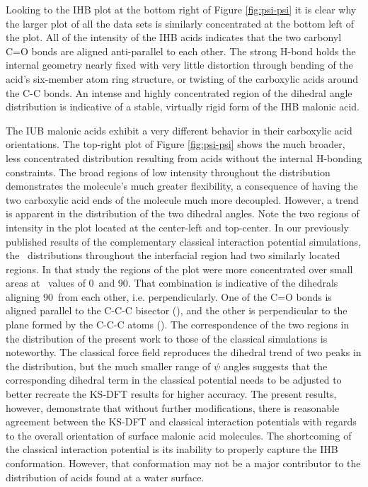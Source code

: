Looking to the IHB plot at the bottom right of Figure \ref{fig:psi-psi} it is clear why the larger plot of all the data sets is similarly concentrated at the bottom left of the plot. All of the intensity of the IHB acids indicates that the two carbonyl C=O bonds are aligned anti-parallel to each other. The strong H-bond holds the internal geometry nearly fixed with very little distortion through bending of the acid's six-member atom ring structure, or twisting of the carboxylic acids around the C-C bonds. An intense and highly concentrated region of the dihedral angle distribution is indicative of a stable, virtually rigid form of the IHB malonic acid.

The IUB malonic acids exhibit a very different behavior in their carboxylic acid orientations. The top-right plot of Figure \ref{fig:psi-psi} shows the much broader, less concentrated distribution resulting from acids without the internal H-bonding constraints. The broad regions of low intensity throughout the distribution demonstrates the molecule's much greater flexibility, a consequence of having the two carboxylic acid ends of the molecule much more decoupled. However, a trend is apparent in the distribution of the two dihedral angles. Note the two regions of intensity in the plot located at the center-left and top-center. In our previously published results of the complementary classical interaction potential simulations,\cite{Blower2012} the \psipsi~distributions throughout the interfacial region had two similarly located regions. In that study the regions of the plot were more concentrated over small areas at \psipsi~values of 0\degr~and 90\degr. That combination is indicative of the dihedrals aligning 90\degr~from each other, i.e. perpendicularly. One of the C=O bonds is aligned parallel to the C-C-C bisector (\degr), and the other is perpendicular to the plane formed by the C-C-C atoms (\degr). The correspondence of the two regions in the distribution of the present work to those of the classical simulations is noteworthy. The classical force field reproduces the dihedral trend of two peaks in the distribution, but the much smaller range of $\psi$ angles suggests that the corresponding dihedral term in the classical potential needs to be adjusted to better recreate the KS-DFT results for higher accuracy. The present results, however, demonstrate that without further modifications, there is reasonable agreement between the KS-DFT and classical interaction potentials with regards to the overall orientation of surface malonic acid molecules. The shortcoming of the classical interaction potential is its inability to properly capture the IHB conformation. However, that conformation may not be a major contributor to the distribution of acids found at a water surface.

